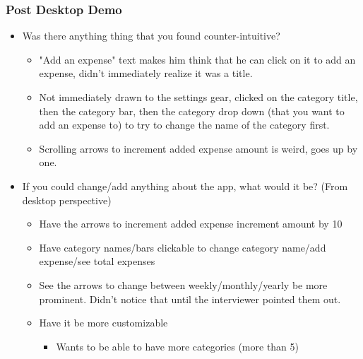 \documentclass{chi2011}
\begin{document}
	\subsubsection{Post Desktop Demo}
	\begin{itemize}[noitemsep]
		\item Was there anything thing that you found counter-intuitive?
		\begin{itemize}[noitemsep]
			\item "Add an expense" text makes him think that he can click on it to add an expense, didn't
					immediately realize it was a title. 
			\item Not immediately drawn to the settings gear, clicked on the category title, then the 
				  category bar, then the category drop down (that you want to add an expense to) to try to
				  change the name of the category first.
			\item Scrolling arrows to increment added expense amount is weird, goes up by one.
		\end{itemize}
		\item If you could change/add anything about the app, what would it be? (From desktop perspective)
		\begin{itemize}[noitemsep]
			\item Have the arrows to increment added expense increment amount by 10
			\item Have category names/bars clickable to change category name/add expense/see total expenses
			\item See the arrows to change between weekly/monthly/yearly be more prominent. Didn't notice 
					that until the interviewer pointed them out. 
			\item Have it be more customizable
			\begin{itemize}[noitemsep]
				\item Wants to be able to have more categories (more than 5)
			\end{itemize}
		\end{itemize}
	\end{itemize}
	
\end{document}

